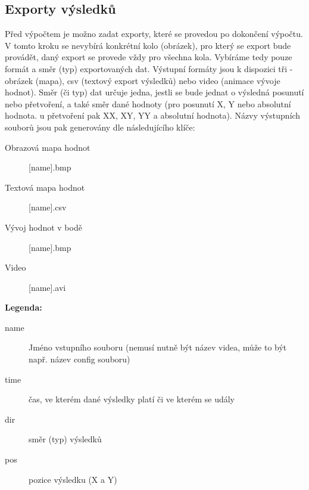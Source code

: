\documentclass[a4paper,12pt]{article}
\begin{document}
\subsection{Exporty výsledků}
\label{sec:exports}
\begin{figure}[H]
\end{figure}
Před výpočtem je možno zadat exporty, které se provedou po dokončení výpočtu. V tomto kroku se nevybírá konkrétní kolo (obrázek), pro který se export bude provádět, daný export se provede vždy pro všechna kola. Vybíráme tedy pouze formát a směr (typ) exportovaných dat. Výstupní formáty jsou k dispozici tři - obrázek (mapa), csv (textový export výsledků) nebo video (animace vývoje hodnot). Směr (či typ) dat určuje jedna, jestli se bude jednat o výsledná posunutí nebo přetvoření, a také směr dané hodnoty (pro posunutí X, Y nebo absolutní hodnota. u přetvoření pak XX, XY, YY a absolutní hodnota). Názvy výstupních souborů jsou pak generovány dle následujícího klíče:
\begin{description}
\item[Obrazová mapa hodnot]  [name]\textunderscore [time]\textunderscore [dir].bmp
\item[Textová mapa hodnot] [name]\textunderscore [pos].csv
\item[Vývoj hodnot v bodě] [name]\textunderscore [time]\textunderscore [dir].bmp
\item[Video] [name]\textunderscore [dir].avi
\end{description}
\begin{center}\textbf{Legenda:}\end{center}
\begin{description}
\item[name] Jméno vstupního souboru (nemusí nutně být název videa, může to být např. název config souboru)
\item[time] čas, ve kterém dané výsledky platí či ve kterém se udály  
\item[dir] směr (typ) výsledků 
\item[pos] pozice výsledku (X a Y)
\end{description}
\end{document}
